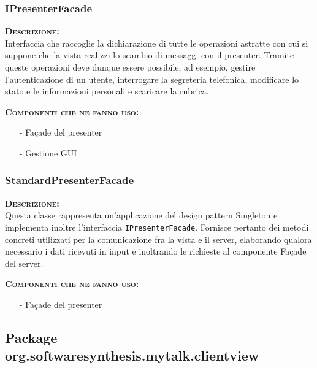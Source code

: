 \subsubsection{IPresenterFacade}
\begin{description}
	\item{\scshape\bfseries Descrizione:}\\
Interfaccia che raccoglie la dichiarazione di tutte le operazioni astratte con cui si suppone che la vista realizzi lo scambio di messaggi con il presenter. Tramite queste operazioni deve dunque essere possibile, ad esempio, gestire l'autenticazione di un utente, interrogare la segreteria telefonica, modificare lo stato e le informazioni personali e scaricare la rubrica.
	\item{\scshape\bfseries Componenti che ne fanno uso:}
	\begin{itemize}[noitemsep,nolistsep]
	  \item[-] Façade del presenter
	  \item[-] Gestione GUI
	\end{itemize}
\end{description}

\subsubsection{StandardPresenterFacade}
\begin{description}
	\item{\scshape\bfseries Descrizione:}\\
Questa classe rappresenta un'applicazione del design pattern Singleton e implementa inoltre l'interfaccia \texttt{IPresenterFacade}. Fornisce pertanto dei metodi concreti utilizzati per la comunicazione fra la vista e il server, elaborando qualora necessario i dati ricevuti in input e inoltrando le richieste al componente Façade del server.
	\item{\scshape\bfseries Componenti che ne fanno uso:}
	\begin{itemize}[noitemsep,nolistsep]
	  \item[-] Façade del presenter
	\end{itemize}
\end{description}

\subsection{Package org.softwaresynthesis.mytalk.clientview}
